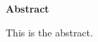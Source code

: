 \newenvironment{abstract}%
    {\cleardoublepage\thispagestyle{empty}\null\vfill\begin{center}%
    \bfseries Abstract \end{center}}%
    {\vfill\null}
        \begin{abstract}
        This is the abstract.
        \end{abstract}
